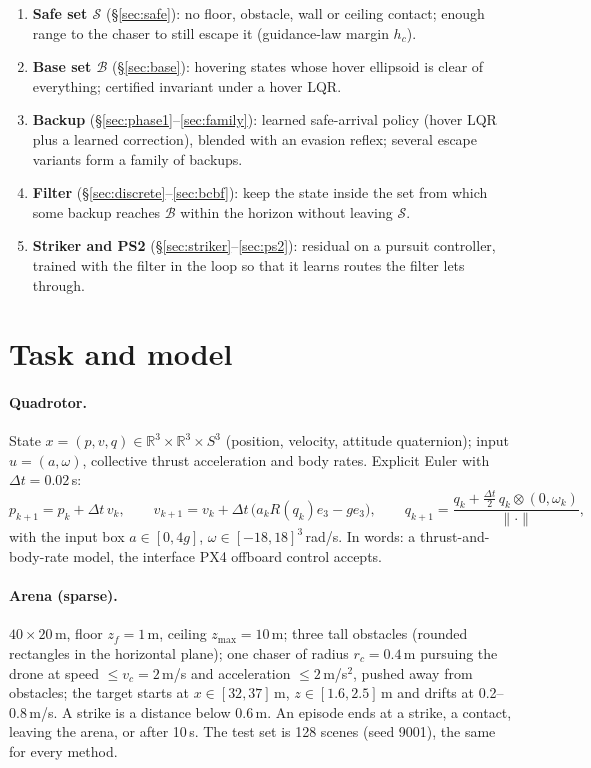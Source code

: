 \documentclass[11pt]{article}
\newcommand{\R}{\mathbb{R}}
\newcommand{\Safe}{\mathcal{S}}
\newcommand{\Base}{\mathcal{B}}
\begin{document}
\begin{enumerate}
\item \textbf{Safe set $\Safe$} (\S\ref{sec:safe}): no floor, obstacle, wall or ceiling contact; enough range to the chaser to still escape it (guidance-law margin $h_c$).
\item \textbf{Base set $\Base$} (\S\ref{sec:base}): hovering states whose hover ellipsoid is clear of everything; certified invariant under a hover LQR.
\item \textbf{Backup} (\S\ref{sec:phase1}--\ref{sec:family}): learned safe-arrival policy (hover LQR plus a learned correction), blended with an evasion reflex; several escape variants form a family of backups.
\item \textbf{Filter} (\S\ref{sec:discrete}--\ref{sec:bcbf}): keep the state inside the set from which some backup reaches $\Base$ within the horizon without leaving $\Safe$.
\item \textbf{Striker and PS2} (\S\ref{sec:striker}--\ref{sec:ps2}): residual on a pursuit controller, trained with the filter in the loop so that it learns routes the filter lets through.
\end{enumerate}

\section{Task and model}\label{sec:model}

\paragraph{Quadrotor.}
State $x=(p,v,q)\in\R^3\times\R^3\times S^3$ (position, velocity, attitude quaternion); input $u=(a,\omega)$, collective thrust acceleration and body rates.
Explicit Euler with $\Delta t=0.02$\,s:
\begin{equation}
p_{k+1}=p_k+\Delta t\,v_k,\qquad
v_{k+1}=v_k+\Delta t\,\big(a_k R(q_k)e_3-g e_3\big),\qquad
q_{k+1}=\frac{q_k+\tfrac{\Delta t}{2}\,q_k\otimes(0,\omega_k)}{\|\cdot\|},
\end{equation}
with the input box $a\in[0,4g]$, $\omega\in[-18,18]^3$\,rad/s.
In words: a thrust-and-body-rate model, the interface PX4 offboard control accepts.

\paragraph{Arena (sparse).}
$40\times20$\,m, floor $z_f=1$\,m, ceiling $z_{\max}=10$\,m; three tall obstacles (rounded rectangles in the horizontal plane);
one chaser of radius $r_c=0.4$\,m pursuing the drone at speed $\le v_c=2$\,m/s and acceleration $\le 2$\,m/s$^2$, pushed away from obstacles;
the target starts at $x\in[32,37]$\,m, $z\in[1.6,2.5]$\,m and drifts at 0.2--0.8\,m/s.
A strike is a distance below 0.6\,m. An episode ends at a strike, a contact, leaving the arena, or after 10\,s.
The test set is 128 scenes (seed 9001), the same for every method.
\end{document}

